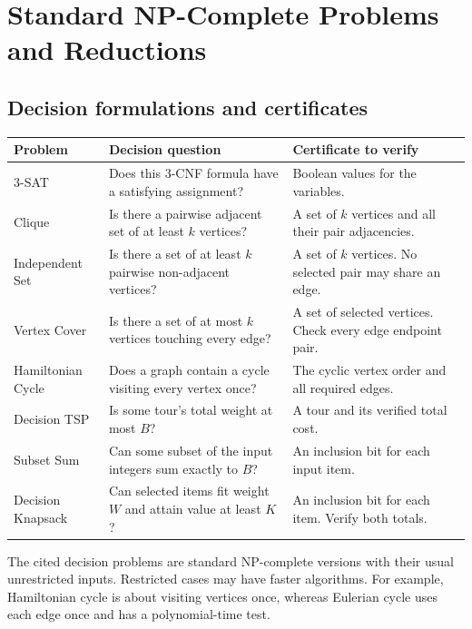 \documentclass[12pt,a4paper]{article}
\begin{document}
\section{Standard NP-Complete Problems and Reductions}
\subsection{Decision formulations and certificates}
\par\vspace{5pt}
\begingroup
\setlength{\extrarowheight}{1pt}
\noindent\begin{tabularx}{\linewidth}{|B{3.4cm}|Y|Y|}
\hline
\textbf{Problem} & \textbf{Decision question} & \textbf{Certificate to verify} \\ -SAT & Does this 3-CNF formula have a satisfying assignment? & Boolean values for the variables. \\ \hline
Clique & Is there a pairwise adjacent set of at least $k$ vertices? & A set of $k$ vertices and all their pair adjacencies. \\ \hline
Independent Set & Is there a set of at least $k$ pairwise non-adjacent vertices? & A set of $k$ vertices. No selected pair may share an edge. \\ \hline
Vertex Cover & Is there a set of at most $k$ vertices touching every edge? & A set of selected vertices. Check every edge endpoint pair. \\ \hline
Hamiltonian Cycle & Does a graph contain a cycle visiting every vertex once? & The cyclic vertex order and all required edges. \\ \hline
Decision TSP & Is some tour's total weight at most $B$? & A tour and its verified total cost. \\ \hline
Subset Sum & Can some subset of the input integers sum exactly to $B$? & An inclusion bit for each input item. \\ \hline
Decision Knapsack & Can selected items fit weight $W$ and attain value at least $K$? & An inclusion bit for each item. Verify both totals. \\ \hline
\end{tabularx}\par
\endgroup
The cited decision problems are standard NP-complete versions with their usual unrestricted inputs. Restricted cases may have faster algorithms. For example, Hamiltonian cycle is about visiting vertices once, whereas Eulerian cycle uses each edge once and has a polynomial-time test.
\end{document}
